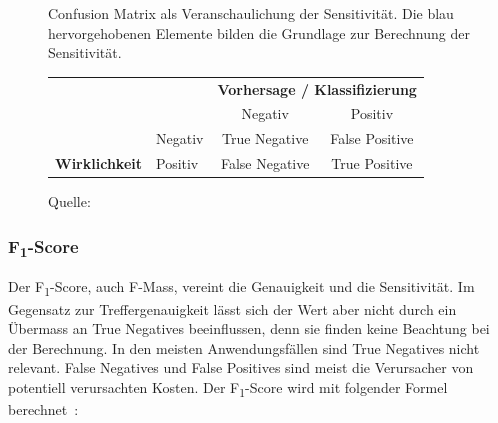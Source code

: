 \begin{figure}[h!]
    \centering
    \captionsetup{width=.9\linewidth}
    \caption[Confusion Matrix als Veranschaulichung der Sensitivität]{Confusion Matrix als Veranschaulichung der Sensitivität. Die blau hervorgehobenen Elemente bilden die Grundlage zur Berechnung der Sensitivität.}
    \def\arraystretch{1.5}
    \begin{tabular}{llcc}
        \multicolumn{2}{l}{}                                                                                                & \multicolumn{2}{c}{\textbf{Vorhersage / Klassifizierung}}                                                                \\ \cline{3-4} 
        \multicolumn{1}{c}{\textbf{}}                                & \multicolumn{1}{l|}{}                                & \multicolumn{1}{c|}{Negativ}                                & \multicolumn{1}{c|}{Positiv}                               \\ \cline{2-4} 
        \multicolumn{1}{l|}{}                                        & \multicolumn{1}{l|}{Negativ}                         & \multicolumn{1}{c|}{True Negative}                          & \multicolumn{1}{c|}{False Positive}                        \\ \cline{2-4} 
        \multicolumn{1}{l|}{\multirow{-2}{*}{\textbf{Wirklichkeit}}} & \multicolumn{1}{l|}{\cellcolor[HTML]{B5D0EE}Positiv} & \multicolumn{1}{c|}{\cellcolor[HTML]{B5D0EE}False Negative} & \multicolumn{1}{c|}{\cellcolor[HTML]{B5D0EE}True Positive} \\ \cline{2-4} 
    \end{tabular}
    \caption*{Quelle: \textcite{TDSAccuracy}}
    \label{cm-recall}
\end{figure}

\subsubsection{F\textsubscript{1}-Score}

Der F\textsubscript{1}-Score, auch F-Mass, vereint die Genauigkeit und die Sensitivität. Im Gegensatz zur Treffergenauigkeit lässt sich der Wert aber nicht durch ein Übermass an True Negatives beeinflussen, denn sie finden keine Beachtung bei der Berechnung. In den meisten Anwendungsfällen sind True Negatives nicht relevant. False Negatives und False Positives sind meist die Verursacher von potentiell verursachten Kosten. Der F\textsubscript{1}-Score wird mit folgender Formel berechnet~\autocite{TDSAccuracy}:

